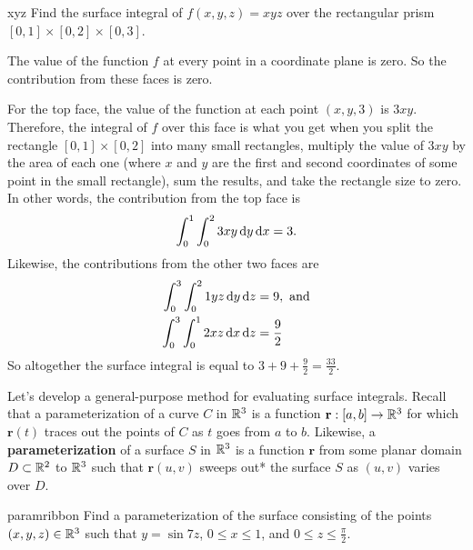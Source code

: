 \documentclass[prettycode,shellescape]{watsonbook}
\begin{document}
\begin{example}{}{xyz}
  Find the surface integral of $f(x,y,z) = xyz$ over the rectangular
  prism $[0,1] \times [0,2] \times [0,3]$. 
\end{example}

\begin{solution}
  The value of the function $f$ at every point in a coordinate plane
  is zero. So the contribution from these faces is zero.

  For the top face, the value of the function at each point $(x,y,3)$
  is $3xy$. Therefore, the integral of $f$ over this face is what you
  get when you split the rectangle $[0,1] \times [0,2]$ into many
  small rectangles, multiply the value of $3xy$ by the area of each
  one (where $x$ and $y$ are the first and second coordinates of some
  point in the small rectangle), sum the results, and take the
  rectangle size to zero. In other words, the contribution from the
  top face is
  \[
    \int_0^1 \int_0^2 3xy \, \mathrm{d} y\, \mathrm{d} x = 3. 
  \]
  Likewise, the contributions from the other two faces are
  \begin{align*}
    \int_0^3 \int_0^2 1yz \, \mathrm{d} y\, \mathrm{d} z &= 9, \text{ and} \\
    \int_{0}^{3}
    \int_{0}^{1}2xz \, \mathrm{d} x\,
    \mathrm{d} z &= \frac{9}{2}
  \end{align*}
  So altogether the surface integral is equal to $\displaystyle{3 + 9 +
    \frac{9}{2}} = \boxed{\frac{33}{2}}$. 
\end{solution}

Let's develop a general-purpose method for evaluating surface
integrals. Recall that a parameterization of a curve $C$ in $\mathbb{R}^3$ is
a function $\mathbf{r}: [a,b] \to \mathbb{R}^3$ for which $\mathbf{r}(t)$
traces out the points of $C$ as $t$ goes from $a$ to $b$. Likewise, a
\textbf{parameterization} of a surface $S$ in $\mathbb{R}^3$ is a function
$\mathbf{r}$ from some planar domain $D \subset \mathbb{R}^2$ to $\mathbb{R}^3$ such
that $\mathbf{r}(u,v)$ sweeps out*  the
surface $S$ as $(u,v)$ varies over $D$.

\begin{example}{}{paramribbon}
  Find a parameterization of the surface consisting of the points
  $(x,y,z) \in \mathbb{R}^3$ such that $y = \sin 7z$, $0 \leq x \leq 1$, and
  $0 \leq z \leq \frac{\pi}{2}$. 
\end{example}
\end{document}
